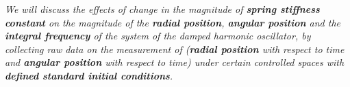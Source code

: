 \textit{We will discuss the effects of change in the magnitude of \textbf{spring stiffness constant} on the magnitude of the \textbf{radial position}, \textbf{angular position} and the \textbf{integral frequency} of the system of the damped harmonic oscillator, by collecting raw data on the measurement of (\textbf{radial position} with respect to time and \textbf{angular position} with respect to time) under certain controlled spaces with \textbf{defined standard initial conditions}.}
